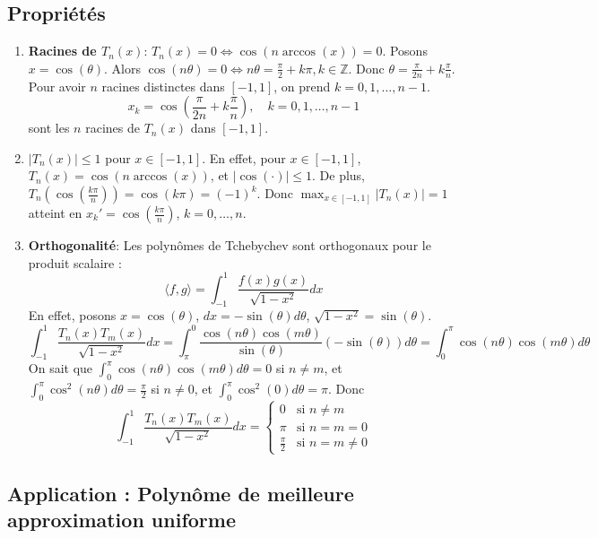 \documentclass{article}
\begin{document}
\subsection{Propriétés}

\begin{enumerate}
    \item \textbf{Racines de $T_n(x)$}:
    $T_n(x) = 0 \Leftrightarrow \cos(n \arccos(x)) = 0$.
    Posons $x = \cos(\theta)$. Alors $\cos(n\theta) = 0 \Leftrightarrow n\theta = \frac{\pi}{2} + k\pi, k \in \mathbb{Z}$.
    Donc $\theta = \frac{\pi}{2n} + k\frac{\pi}{n}$.
    Pour avoir $n$ racines distinctes dans $[-1, 1]$, on prend $k = 0, 1, \dots, n-1$.
    \[
    x_k = \cos\left(\frac{\pi}{2n} + k\frac{\pi}{n}\right), \quad k = 0, 1, \dots, n-1
    \]
    sont les $n$ racines de $T_n(x)$ dans $[-1, 1]$.

    \item $|T_n(x)| \leq 1$ pour $x \in [-1, 1]$.
    En effet, pour $x \in [-1, 1]$, $T_n(x) = \cos(n \arccos(x))$, et $|\cos(\cdot)| \leq 1$.
    De plus, $T_n(\cos(\frac{k\pi}{n})) = \cos(k\pi) = (-1)^k$.
    Donc $\max_{x \in [-1, 1]} |T_n(x)| = 1$ atteint en $x_k' = \cos(\frac{k\pi}{n})$, $k = 0, \dots, n$.

    \item \textbf{Orthogonalité}:
    Les polynômes de Tchebychev sont orthogonaux pour le produit scalaire :
    \[
    \langle f, g \rangle = \int_{-1}^{1} \frac{f(x)g(x)}{\sqrt{1-x^2}} dx
    \]
    En effet, posons $x = \cos(\theta)$, $dx = -\sin(\theta) d\theta$, $\sqrt{1-x^2} = \sin(\theta)$.
    \[
    \int_{-1}^{1} \frac{T_n(x)T_m(x)}{\sqrt{1-x^2}} dx = \int_{\pi}^{0} \frac{\cos(n\theta)\cos(m\theta)}{\sin(\theta)} (-\sin(\theta)) d\theta = \int_{0}^{\pi} \cos(n\theta)\cos(m\theta) d\theta
    \]
    On sait que $\int_{0}^{\pi} \cos(n\theta)\cos(m\theta) d\theta = 0$ si $n \neq m$, et $\int_{0}^{\pi} \cos^2(n\theta) d\theta = \frac{\pi}{2}$ si $n \neq 0$, et $\int_{0}^{\pi} \cos^2(0) d\theta = \pi$.
    Donc
    \[
    \int_{-1}^{1} \frac{T_n(x)T_m(x)}{\sqrt{1-x^2}} dx =
    \begin{cases}
        0 & \text{si } n \neq m \\
        \pi & \text{si } n = m = 0 \\
        \frac{\pi}{2} & \text{si } n = m \neq 0
    \end{cases}
    \]
\end{enumerate}

\subsection{Application : Polynôme de meilleure approximation uniforme}
\end{document}
